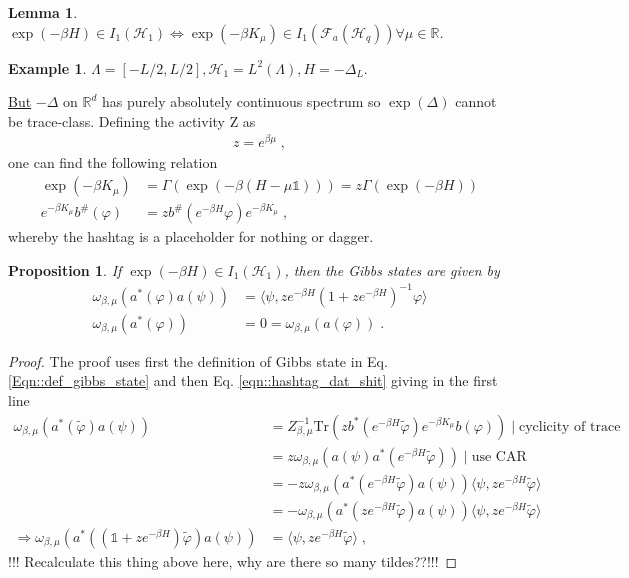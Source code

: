 \documentclass[
a4paper, %
11pt, %
onecolumn, %
openany, %
]{memoir}
\theoremstyle{definition}
\newtheorem{example}{Example}[chapter]
\theoremstyle{remark}
\theoremstyle{plain}
\newtheorem{prop}{Proposition}[chapter]
\newtheorem{lemma}{Lemma}[chapter]
\begin{document}
\begin{lemma}
	$\exp(-\beta H)\in I_1(\mathcal{H}_1)\Leftrightarrow \exp(-\beta K_{\mu})\in I_1(\mathcal{F}_a(\mathcal{H}_q))\forall\mu\in \mathbb{R}$.
\end{lemma}
\begin{example}
	$\Lambda=[-L/2,L/2], \mathcal{H}_1=L^2(\Lambda), H=-\Delta_L$.

\underline{But} $-\Delta$ on $\mathbb{R}^d$ has purely absolutely continuous spectrum so $\exp(\Delta)$ cannot be trace-class. Defining the activity Z as \begin{align}
z=e^{\beta\mu}\; ,
\end{align}
one can find the following relation \begin{align}
\exp(-\beta K_{\mu})&=\Gamma(\exp(-\beta(H-\mu\mathds{1})))=z\Gamma(\exp(-\beta H))\\
e^{-\beta K_{\mu}}b^{\#}(\varphi)&=zb^{\#}(e^{-\beta H}\varphi)e^{-\beta K_{\mu}}\label{eqn::hashtag_dat_shit}\; ,
\end{align}
whereby the hashtag is a placeholder for nothing or dagger.
\begin{prop}
	If $\exp(-\beta H)\in I_1(\mathcal{H}_1)$, then the Gibbs states are given by\begin{align}
	\omega_{\beta,\mu}(a^{*}(\varphi)a(\psi))&=\langle \psi, ze^{-\beta H}(1+ze^{-\beta H})^{-1}\varphi\rangle\\
	\omega_{\beta,\mu}(a^*(\varphi))&=0=\omega_{\beta,\mu}(a(\varphi))\; .
	\end{align}
\end{prop}
\begin{proof}
	The proof uses first the definition of Gibbs state in Eq. \eqref{Eqn::def_gibbs_state} and then Eq. \eqref{eqn::hashtag_dat_shit} giving in the first line\begin{align}
	\omega_{\beta,\mu}(a^{*}(\tilde{\varphi})a(\psi))&=Z^{-1}_{\beta,\mu}\mathrm{Tr}(zb^*(e^{-\beta H}\tilde{\varphi})e^{-\beta K_{\mu}}b(\varphi)) \mid \text{cyclicity of trace}\\
	&=z\omega_{\beta,\mu}(a(\psi)a^*(e^{-\beta H}\tilde{\varphi})) \mid \text{use CAR}\\
	&=-z\omega_{\beta,\mu}(a^*(e^{-\beta H}\tilde{\varphi})a(\psi))\langle \psi, ze^{-\beta H}\tilde{\varphi}\rangle\\
	&=-\omega_{\beta,\mu}(a^*(ze^{-\beta H}\tilde{\varphi})a(\psi))\langle \psi, ze^{-\beta H}\tilde{\varphi}\rangle\\
	\Rightarrow \omega_{\beta,\mu}(a^*((\mathds{1}+ze^{-\beta H})\tilde{\varphi})a(\psi))&=\langle \psi, ze^{-\beta H} \tilde{\varphi}\rangle\; ,
	\end{align}
	!!! Recalculate this thing above here, why are there so many tildes??!!!
	

\end{proof}
\end{example}
\end{document}
